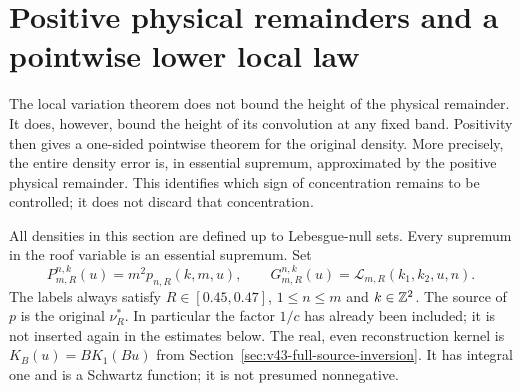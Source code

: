 \section{Positive physical remainders and a pointwise lower local law}
\label{sec:v51-positive-remainder}
The local variation theorem does not bound the height of the physical
remainder. It does, however, bound the height of its convolution at
any fixed band. Positivity then gives a one-sided pointwise theorem
for the original density. More precisely, the entire density error
is, in essential supremum, approximated by the positive physical
remainder. This identifies which sign of concentration remains to be
controlled; it does not discard that concentration.

All densities in this section are defined up to Lebesgue-null sets.
Every supremum in the roof variable is an essential supremum. Set
\[
 P_{m,R}^{n,k}(u)=m^2p_{n,R}(k,m,u),\qquad
 G_{m,R}^{n,k}(u)=\mathcal L_{m,R}(k_1,k_2,u,n).
\]
The labels always satisfy $R\in[0.45,0.47]$, $1\le n\le m$ and
$k\in\mathbb Z^2$. The source of $p$ is the original $\nu_R^*$.
In particular the factor $1/c$ has already been included; it is not
inserted again in the estimates below. The real, even reconstruction
kernel is $K_B(u)=BK_1(Bu)$ from
Section~\ref{sec:v43-full-source-inversion}. It has integral one and is a
Schwartz function; it is not presumed nonnegative.


